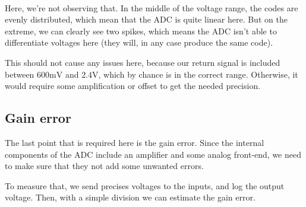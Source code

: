\paragraph{}
Here, we're not observing that. In the middle of the voltage range, the codes are evenly distributed, which
mean that the ADC is quite linear here. But on the extreme, we can clearly see two spikes, which means the ADC 
isn't able to differentiate voltages here (they will, in any case produce the same code).

This should not cause any issues here, because our return signal is included between $600 \si{\milli\volt}$ 
and $2.4 \si{\volt}$, which by chance is in the correct range. Otherwise, it would require some amplification
or offset to get the needed precision.


\FloatBarrier
\subsection{Gain error}
The last point that is required here is the gain error. Since the internal components of the ADC include
an amplifier and some analog front-end, we need to make sure that they not add some unwanted errors.

To measure that, we send precises voltages to the inputs, and log the output voltage.
Then, with a simple division we can estimate the gain error.

